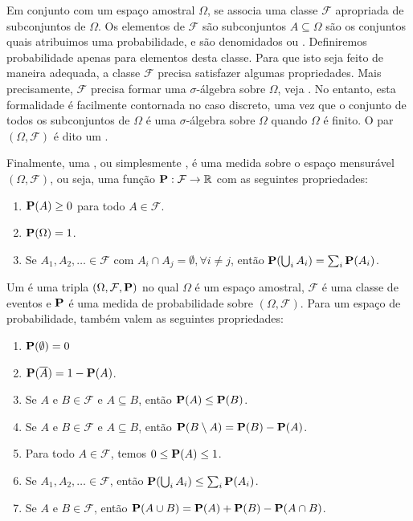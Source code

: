 Em conjunto com um espaço amostral $\Omega$, se associa uma classe $\mathcal{F}$ apropriada de subconjuntos de $\Omega$. Os elementos de $\mathcal{F}$ são subconjuntos $A \subseteq \Omega$ são os conjuntos quais atribuimos uma probabilidade, e são denomidados  ou . Definiremos probabilidade apenas para elementos desta classe. Para que isto seja feito de maneira adequada, a classe $\mathcal{F}$ precisa satisfazer algumas propriedades. Mais precisamente, $\mathcal{F}$ precisa formar uma $\sigma$-álgebra sobre $\Omega$, veja \cite{barryjames}.
No entanto, esta formalidade é facilmente contornada no caso discreto, uma vez que o conjunto de todos os subconjuntos de $\Omega$ é uma $\sigma$-álgebra sobre $\Omega$ quando $\Omega$ é finito. O par $(\Omega, \mathcal{F})$ é dito um .

Finalmente, uma , ou simplesmente , é uma medida sobre o espaço mensurável $(\Omega, \mathcal{F})$, ou seja, uma função $\operatorname{\mathbf{P}} : \mathcal{F} \to \mathbb{R}$ com as seguintes propriedades:

\begin{enumerate}[label=(P\arabic*),itemindent=*]
  \item $\operatorname{\mathbf{P}}(A) \geq 0$ para todo $A \in \mathcal{F}$.
  \item $\operatorname{\mathbf{P}}(\Omega) = 1$.
  \item Se $A_1, A_2, \dots \in \mathcal{F}$ com $A_i \cap A_j = \emptyset, \forall i \neq j$, então $\operatorname{\mathbf{P}}( \bigcup_{i} A_i ) = \sum_i \operatorname{\mathbf{P}}(A_i)$.
\end{enumerate}

Um  é uma tripla $(\Omega, \mathcal{F}, \operatorname{\mathbf{P}})$ no qual $\Omega$ é um espaço amostral, $\mathcal{F}$ é uma classe de eventos e $\operatorname{\mathbf{P}}$ é uma medida de probabilidade sobre $(\Omega, \mathcal{F})$. Para um espaço de probabilidade, também valem as seguintes propriedades:

\begin{enumerate}[label=\arabic*.,itemindent=*]
  \item $\operatorname{\mathbf{P}}(\emptyset) = 0$
  \item $\operatorname{\mathbf{P}}(\overline{A}) = 1 - \operatorname{\mathbf{P}}(A)$.
  \item Se $A$ e $B \in \mathcal{F}$ e $A \subseteq B$, então $\operatorname{\mathbf{P}}(A) \leq \operatorname{\mathbf{P}}(B)$.
  \item Se $A$ e $B \in \mathcal{F}$ e $A \subseteq B$, então $\operatorname{\mathbf{P}}(B \setminus A) = \operatorname{\mathbf{P}}(B) - \operatorname{\mathbf{P}}(A)$.
  \item Para todo $A \in \mathcal{F}$, temos $0 \leq \operatorname{\mathbf{P}}(A) \leq 1$.
  \item Se $A_1, A_2, \dots \in \mathcal{F}$, então $\operatorname{\mathbf{P}}( \bigcup_{i} A_i ) \leq \sum_i \operatorname{\mathbf{P}}(A_i)$.
  \item Se $A$ e $B \in \mathcal{F}$, então $\operatorname{\mathbf{P}}(A \cup B) = \operatorname{\mathbf{P}}(A) + \operatorname{\mathbf{P}}(B) - \operatorname{\mathbf{P}}(A \cap B)$.
\end{enumerate}

